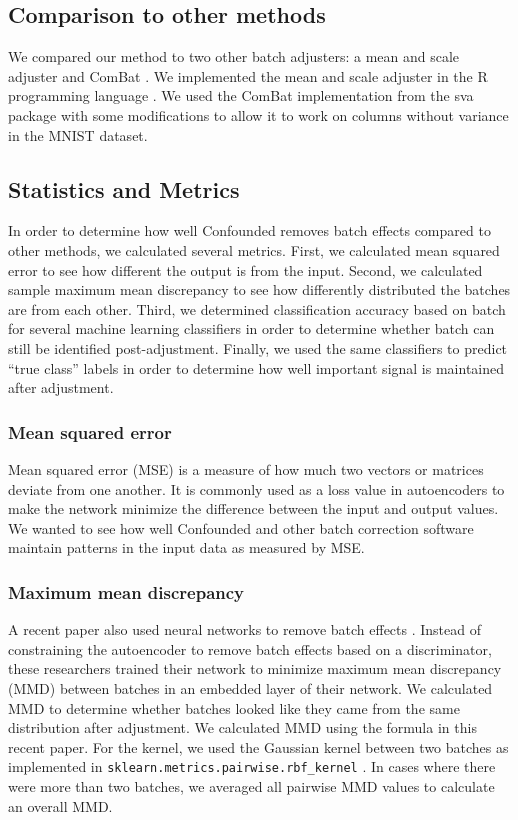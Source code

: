 \documentclass[notitlepage]{article}
\begin{document}
\subsection{Comparison to other methods}

We compared our method to two other batch adjusters: a mean and scale adjuster and ComBat \cite{johnson_adjusting_2007}.
We implemented the mean and scale adjuster in the R programming language \cite{r_core_team_r_2014}.
We used the ComBat implementation from the sva package \cite{leek_sva_2017} with some modifications to allow it to work on columns without variance in the MNIST dataset.

\subsection{Statistics and Metrics}

In order to determine how well Confounded removes batch effects compared to other methods, we calculated several metrics.
First, we calculated mean squared error to see how different the output is from the input.
Second, we calculated sample maximum mean discrepancy to see how differently distributed the batches are from each other.
Third, we determined classification accuracy based on batch for several machine learning classifiers in order to determine whether batch can still be identified post-adjustment.
Finally, we used the same classifiers to predict ``true class'' labels in order to determine how well important signal is maintained after adjustment.

\subsubsection{Mean squared error}

Mean squared error (MSE) is a measure of how much two vectors or matrices deviate from one another.
It is commonly used as a loss value in autoencoders to make the network minimize the difference between the input and output values.
We wanted to see how well Confounded and other batch correction software maintain patterns in the input data as measured by MSE.

\subsubsection{Maximum mean discrepancy} \label{section:mmd}

A recent paper also used neural networks to remove batch effects \cite{shaham_removal_2017}.
Instead of constraining the autoencoder to remove batch effects based on a discriminator, these researchers trained their network to minimize maximum mean discrepancy (MMD) between batches in an embedded layer of their network.
We calculated MMD to determine whether batches looked like they came from the same distribution after adjustment.
We calculated MMD using the formula in this recent paper.
For the kernel, we used the Gaussian kernel between two batches as implemented in \texttt{sklearn.metrics.pairwise.rbf\_kernel} \cite{pedregosa_scikit-learn_2011}.
In cases where there were more than two batches, we averaged all pairwise MMD values to calculate an overall MMD.
\end{document}
